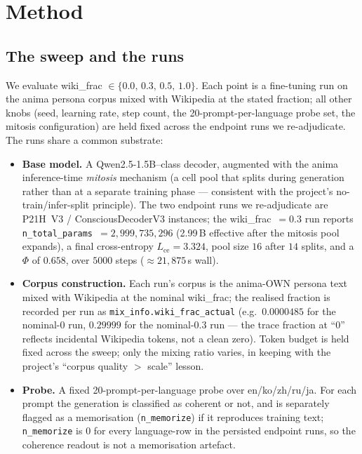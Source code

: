 \documentclass[11pt,a4paper]{article}
\begin{document}
\section{Method}
\label{sec:method}

\subsection{The sweep and the runs}

We evaluate wiki\_frac $\in\{0.0,\,0.3,\,0.5,\,1.0\}$. Each point is a
fine-tuning run on the anima persona corpus mixed with Wikipedia at the
stated fraction; all other knobs (seed, learning rate, step count, the
20-prompt-per-language probe set, the mitosis configuration) are held
fixed across the endpoint runs we re-adjudicate. The runs share a common
substrate:

\begin{itemize}\itemsep0.25em
\item \textbf{Base model.} A Qwen2.5-1.5B--class decoder, augmented with
  the anima inference-time \emph{mitosis} mechanism (a cell pool that
  splits during generation rather than at a separate training phase ---
  consistent with the project's no-train/infer-split principle). The two
  endpoint runs we re-adjudicate are P21H~V3 / ConsciousDecoderV3
  instances; the wiki\_frac~$=0.3$ run reports
  \verb|n_total_params|~$=2{,}999{,}735{,}296$ (2.99\,B effective after
  the mitosis pool expands), a final cross-entropy $L_{\mathrm{ce}}=3.324$,
  pool size $16$ after $14$ splits, and a $\Phi$ of $0.658$, over $5000$
  steps ($\approx 21{,}875$\,s wall).
\item \textbf{Corpus construction.} Each run's corpus is the anima-OWN
  persona text mixed with Wikipedia at the nominal wiki\_frac; the
  realised fraction is recorded per run as
  \verb|mix_info.wiki_frac_actual| (e.g.\ $0.0000485$ for the nominal-$0$
  run, $0.29999$ for the nominal-$0.3$ run --- the trace fraction at
  ``$0$'' reflects incidental Wikipedia tokens, not a clean zero). Token
  budget is held fixed across the sweep; only the mixing ratio varies, in
  keeping with the project's ``corpus quality $>$ scale'' lesson.
\item \textbf{Probe.} A fixed 20-prompt-per-language probe over
  en/ko/zh/ru/ja. For each prompt the generation is classified as
  coherent or not, and is separately flagged as a memorisation
  (\verb|n_memorize|) if it reproduces training text; \verb|n_memorize|
  is $0$ for every language-row in the persisted endpoint runs, so the
  coherence readout is not a memorisation artefact.
\end{itemize}
\end{document}
